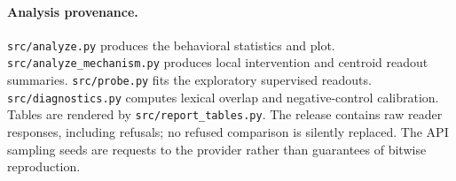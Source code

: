 \paragraph{Analysis provenance.}
\texttt{src/analyze.py} produces the behavioral statistics and plot. \texttt{src/analyze\_mechanism.py} produces local intervention and centroid readout summaries. \texttt{src/probe.py} fits the exploratory supervised readouts. \texttt{src/diagnostics.py} computes lexical overlap and negative-control calibration. Tables are rendered by \texttt{src/report\_tables.py}. The release contains raw reader responses, including refusals; no refused comparison is silently replaced. The API sampling seeds are requests to the provider rather than guarantees of bitwise reproduction.
